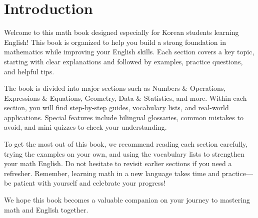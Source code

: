 
\section*{Introduction}
Welcome to this math book designed especially for Korean students learning English! 
This book is organized to help you build a strong foundation in mathematics while 
improving your English skills. Each section covers a key topic, starting with clear 
explanations and followed by examples, practice questions, and helpful tips.

The book is divided into major sections such as Numbers \& Operations, Expressions 
\& Equations, Geometry, 
Data \& Statistics, and more. Within each section, you will find step-by-step guides, 
vocabulary lists, and real-world applications. Special features include bilingual 
glossaries, common mistakes to avoid, and mini quizzes to check your understanding.

To get the most out of this book, we recommend reading each section carefully, 
trying the examples on your own, and using the vocabulary lists to strengthen 
your math English. Do not hesitate to revisit earlier sections if you need a 
refresher. Remember, learning math in a new language takes time and practice—be 
patient with yourself and celebrate your progress!

We hope this book becomes a valuable companion on your journey to mastering math 
and English together.
